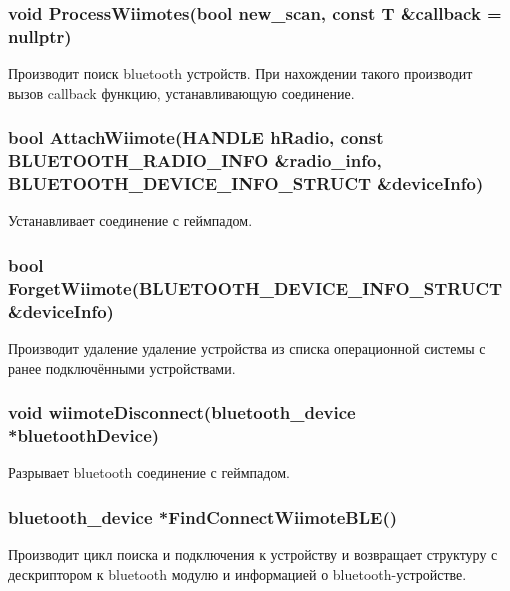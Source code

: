 \subsubsection{void ProcessWiimotes(bool new\_scan, const T \&callback = nullptr)}
\quad Производит поиск bluetooth устройств.
При нахождении такого производит вызов callback функцию, устанавливающую соединение.

\subsubsection{bool AttachWiimote(HANDLE hRadio, const BLUETOOTH\_RADIO\_INFO \&radio\_info, BLUETOOTH\_DEVICE\_INFO\_STRUCT \&deviceInfo)}
\quad Устанавливает соединение с геймпадом.

\subsubsection{bool ForgetWiimote(BLUETOOTH\_DEVICE\_INFO\_STRUCT \&deviceInfo)}
\quad Производит удаление удаление устройства из списка операционной системы с ранее подключёнными устройствами.

\subsubsection{void wiimoteDisconnect(bluetooth\_device *bluetoothDevice)}
\quad Разрывает bluetooth соединение с геймпадом.

\subsubsection{bluetooth\_device *FindConnectWiimoteBLE()}
\quad Производит цикл поиска и подключения к устройству и возвращает структуру с дескриптором к bluetooth модулю и информацией о bluetooth-устройстве.
\newcommand{\centered}[1]{\begin{tabular}{l} #1 \end{tabular}}
